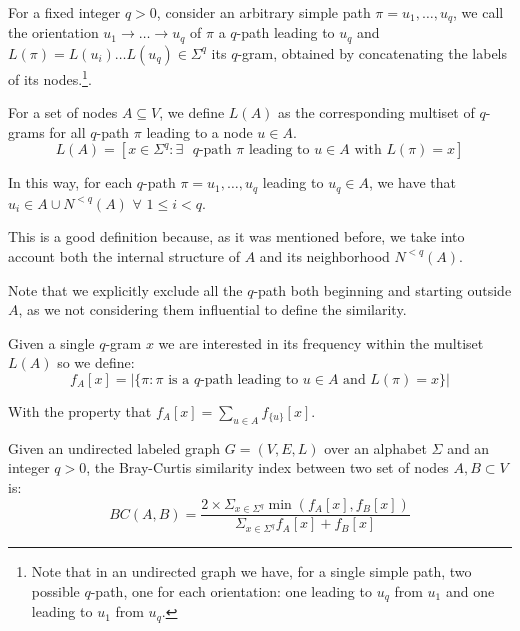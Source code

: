 For a fixed integer $q > 0$, consider an arbitrary simple path $\pi = u_{1}, \ldots, u_{q}$, we call the orientation $u_{1} \rightarrow \ldots \rightarrow u_{q}$ of $\pi$ a $q$-path leading to $u_{q}$ and $L(\pi) = L(u_{i}) \ldots L(u_{q}) \in \Sigma^{q}$ its $q$-gram, obtained by concatenating the labels of its nodes.\footnote{Note that in an undirected graph we have, for a single simple path, two possible $q$-path, one for each orientation: one leading to $u_{q}$ from $u_{1}$ and one leading to $u_{1}$ from $u_{q}$.}.\medskip

For a set of nodes $A \subseteq V$, we define $L(A)$ as the corresponding multiset of $q$-grams for all $q$-path $\pi$ leading to a node $u \in A$. 
\begin{equation}
L(A) = [x \in \Sigma^{q} : \exists \text{ $q$-path } \pi \text{ leading to } u \in A \text{ with } L(\pi) = x]
\end{equation}

In this way, for each $q$-path $\pi = u_{1}, \ldots, u_{q}$ leading to $u_{q} \in A$, we have that $u_{i} \in A \cup N^{<q}(A)$ $\forall$ $1 \leq i < q$. \medskip

This is a good definition because, as it was mentioned before, we take into account both the internal structure of $A$ and its neighborhood $N^{<q}(A)$. 

Note that we explicitly exclude all the $q$-path both beginning and starting outside $A$, as we not considering them influential to define the similarity.\medskip

Given a single $q$-gram $x$ we are interested in its frequency within the multiset $L(A)$ so we define:
\begin{equation}
f_{A}[x] = |\{ \pi : \pi \text{ is a $q$-path leading to } u \in A \text{ and } L(\pi) = x \}|
\end{equation}

With the property that $f_{A}[x] = \sum_{u \in A}{f_{\{u\}}[x]}$.

\begin{definizione}
	Given an undirected labeled graph $G = (V,E,L)$ over an alphabet $\Sigma$ and an integer $q > 0$, the Bray-Curtis similarity index between two set of nodes $A, B \subset V$ is:
	\begin{equation}\label{bray-sub}
	BC(A,B) = \frac{ 2 \times \Sigma_{x \in \Sigma^{q}} \min(f_{A}[x], f_{B}[x]) }{ \Sigma_{x \in \Sigma^{q}} f_{A}[x] + f_{B}[x] }
	\end{equation}
\end{definizione}

